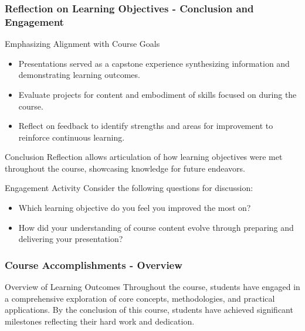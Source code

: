 \documentclass[aspectratio=169]{beamer}
\begin{document}
\begin{frame}[fragile]
    \frametitle{Reflection on Learning Objectives - Conclusion and Engagement}
    \begin{block}{Emphasizing Alignment with Course Goals}
        \begin{itemize}
            \item Presentations served as a capstone experience synthesizing information and demonstrating learning outcomes. 
            \item Evaluate projects for content and embodiment of skills focused on during the course.
            \item Reflect on feedback to identify strengths and areas for improvement to reinforce continuous learning.
        \end{itemize}
    \end{block}
    
    \begin{block}{Conclusion}
        Reflection allows articulation of how learning objectives were met throughout the course, showcasing knowledge for future endeavors.
    \end{block}
    
    \begin{block}{Engagement Activity}
        Consider the following questions for discussion:
        \begin{itemize}
            \item Which learning objective do you feel you improved the most on?
            \item How did your understanding of course content evolve through preparing and delivering your presentation?
        \end{itemize}
    \end{block}
\end{frame}

\begin{frame}[fragile]
    \frametitle{Course Accomplishments - Overview}
    \begin{block}{Overview of Learning Outcomes}
        Throughout the course, students have engaged in a comprehensive exploration of core concepts, methodologies, and practical applications. 
        By the conclusion of this course, students have achieved significant milestones reflecting their hard work and dedication.
    \end{block}
\end{frame}
\end{document}
